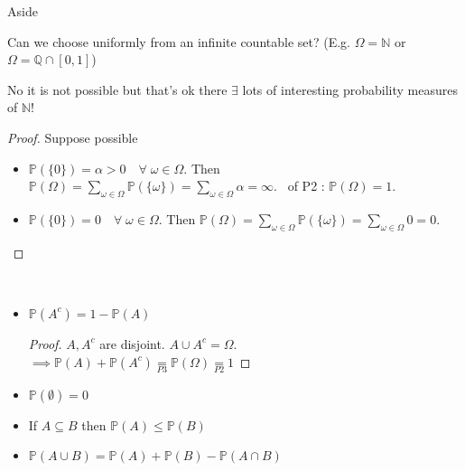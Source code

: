 \begin{aside}{Aside}
    \begin{question}
        Can we choose uniformly from an infinite countable set? (E.g. $\Omega = \mathbb{N}$ or $\Omega = \mathbb{Q} \cap [0, 1]$)
    \end{question}

    \begin{answer}
        No it is not possible but that's ok there $\exists$ lots of interesting probability measures of $\mathbb{N}$!
    \end{answer}
    \begin{proof}
        Suppose possible
        \begin{itemize}
            \item $\mathbb{P}(\{0\}) = \alpha > 0 \quad \forall \; \omega \in \Omega$.
            Then $\mathbb{P}(\Omega) = \sum_{\omega \in \Omega} \mathbb{P}(\{ \omega \}) = \sum_{\omega \in \Omega} \alpha = \infty.$ \Lightning \ of P2 : $\mathbb{P}(\Omega) = 1$.
            \item $\mathbb{P}(\{0\}) = 0 \quad \forall \; \omega \in \Omega$.
            Then $\mathbb{P}(\Omega) = \sum_{\omega \in \Omega} \mathbb{P}(\{ \omega \}) = \sum_{\omega \in \Omega} 0 = 0.$
        \end{itemize}
    \end{proof}
\end{aside}

\begin{proposition} ~\vspace*{-1.5\baselineskip}
    \begin{itemize}
        \item $\mathbb{P}(A^c) = 1 - \mathbb{P}(A)$
        \begin{proof}
            $A, A^c$ are disjoint. $A \cup A^c = \Omega$.\\
            $\implies \mathbb{P}(A) + \mathbb{P}(A^c) \underset{P3}{=} \mathbb{P}(\Omega) \underset{P2}{=} 1$
        \end{proof}
        \item $\mathbb{P}(\emptyset) = 0$
        \item If $A \subseteq B$ then $\mathbb{P}(A) \leq \mathbb{P}(B)$
        \item $\mathbb{P}(A \cup B) = \mathbb{P}(A) + \mathbb{P}(B) - \mathbb{P}(A \cap B)$
    \end{itemize}
\end{proposition}

